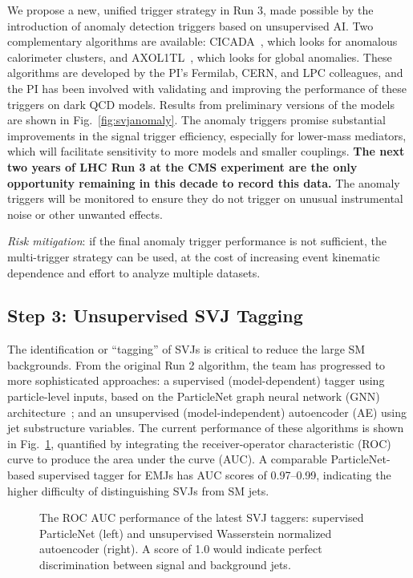 We propose a new, unified trigger strategy in Run 3, made possible by the introduction of anomaly detection triggers based on unsupervised AI.
Two complementary algorithms are available: CICADA~\cite{CMS-DP-2023-086}, which looks for anomalous calorimeter clusters, and AXOL1TL~\cite{CMS-DP-2023-079}, which looks for global anomalies.
These algorithms are developed by the PI's Fermilab, CERN, and LPC colleagues, and the PI has been involved with validating and improving the performance of these triggers on dark QCD models.
Results from preliminary versions of the models are shown in Fig.~\ref{fig:svjanomaly}.
The anomaly triggers promise substantial improvements in the signal trigger efficiency, especially for lower-mass mediators,
which will facilitate sensitivity to more models and smaller couplings.
\textbf{The next two years of LHC Run 3 at the CMS experiment are the only opportunity remaining in this decade to record this data.}
The anomaly triggers will be monitored to ensure they do not trigger on unusual instrumental noise or other unwanted effects.

\textit{Risk mitigation}: if the final anomaly trigger performance is not sufficient, the multi-trigger strategy can be used, at the cost of increasing event kinematic dependence and effort to analyze multiple datasets.

\subsection{Step 3: Unsupervised SVJ Tagging}\label{subsec:tagging}

The identification or ``tagging'' of SVJs is critical to reduce the large SM backgrounds.
From the original Run 2 algorithm, the team has progressed to more sophisticated approaches:
a supervised (model-dependent) tagger using particle-level inputs, based on the ParticleNet graph neural network (GNN) architecture~\cite{Qu:2019gqs};
and an unsupervised (model-independent) autoencoder (AE) using jet substructure variables.
The current performance of these algorithms is shown in Fig.~\ref{fig:svjtaggers}, quantified by integrating the receiver-operator characteristic (ROC) curve to produce the area under the curve (AUC).
A comparable ParticleNet-based supervised tagger for EMJs has AUC scores of 0.97--0.99, indicating the higher difficulty of distinguishing SVJs from SM jets.

\begin{figure}[htb!]
\centering
{}
\caption{The ROC AUC performance of the latest SVJ taggers: supervised ParticleNet (left) and unsupervised Wasserstein normalized autoencoder (right).
A score of 1.0 would indicate perfect discrimination between signal and background jets.}
\label{fig:svjtaggers}
\end{figure}


